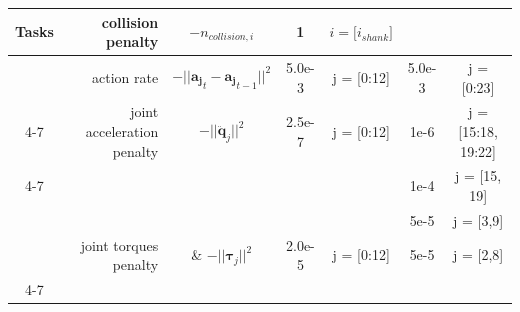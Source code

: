 \documentclass[9pt,twocolumn,twoside]{osajnl}
\begin{document}
\begin{table}[h]
\begin{tabular}{|crc|cc|cc|}
\multicolumn{1}{|c|}{\multirow{-4}{*}{Tasks}}       & collision penalty                       & $-n_{collision, i}$                                               & \multicolumn{1}{c|}{1}                           & $i = {[}i_{shank}{]}$                & \multicolumn{1}{c|}{\cellcolor[HTML]{9B9B9B}}    & \cellcolor[HTML]{9B9B9B}                                                                                     \\ \hline
\multicolumn{1}{|c|}{}                              & action rate                             & $-||\mathbf{a_j}_t - \mathbf{a_j}_{t-1}||^2$                      & \multicolumn{1}{c|}{5.0e-3}                      & j = {[}0:12{]}                         & \multicolumn{1}{c|}{5.0e-3}                      & j = {[}0:23{]}                                                                                               \\ \cline{4-7} 
\multicolumn{1}{|c|}{}                              & joint acceleration penalty              & $-||\mathbf{\ddot{q}}_j||^2$                                      & \multicolumn{1}{c|}{2.5e-7}                      & j = {[}0:12{]}                         & \multicolumn{1}{c|}{1e-6}                        & j = {[}15:18, 19:22{]}                                                                                       \\ \cline{4-7} 
\multicolumn{1}{|c|}{}                              &                                         &                                                                   & \multicolumn{1}{c|}{}                            &                                        & \multicolumn{1}{c|}{1e-4}                        & j = {[}15, 19{]}                                                                                             \\
\multicolumn{1}{|c|}{}                              &                                         &                                                                   & \multicolumn{1}{c|}{}                            &                                        & \multicolumn{1}{c|}{5e-5}                        & j = {[}3,9{]}                                                                                                \\
\multicolumn{1}{|c|}{}                              & \multirow{-3}{*}{joint torques penalty} & \multirow{-3}{*}{\&   $-||\boldsymbol{\tau}_j||^2$}               & \multicolumn{1}{c|}{\multirow{-3}{*}{2.0e-5}}    & \multirow{-3}{*}{j = {[}0:12{]}}       & \multicolumn{1}{c|}{5e-5}                        & j = {[}2,8{]}                                                                                                \\ \cline{4-7} 

\end{tabular}
\end{table}
\end{document}
